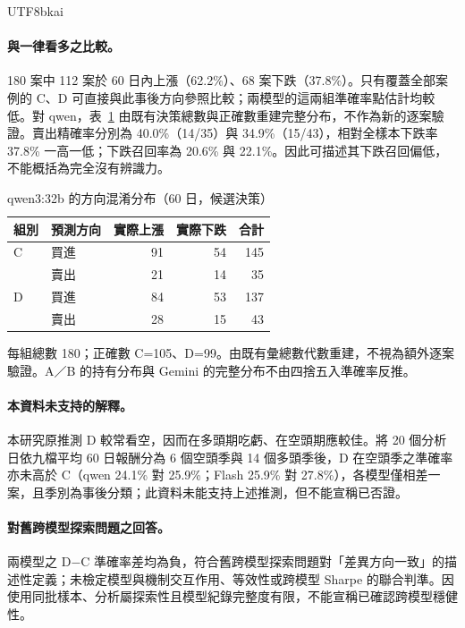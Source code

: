 \documentclass[12pt,a4paper]{article}
\newcommand{\grp}[1]{\textsf{#1}}
\begin{document}
\begin{CJK}{UTF8}{bkai}
\paragraph{與一律看多之比較。} 180 案中 112 案於 60 日內上漲（62.2\%）、68 案下跌（37.8\%）。只有覆蓋全部案例的 \grp{C}、\grp{D} 可直接與此事後方向參照比較；兩模型的這兩組準確率點估計均較低。對 qwen，表~\ref{tab:confusion} 由既有決策總數與正確數重建完整分布，不作為新的逐案驗證。賣出精確率分別為 40.0\%（14/35）與 34.9\%（15/43），相對全樣本下跌率 37.8\% 一高一低；下跌召回率為 20.6\% 與 22.1\%。因此可描述其下跌召回偏低，不能概括為完全沒有辨識力。

\begin{table}[H]
\centering\small
\caption{qwen3:32b 的方向混淆分布（60 日，候選決策）}
\label{tab:confusion}
\begin{tabular}{@{}llrrr@{}}
\toprule
組別 & 預測方向 & 實際上漲 & 實際下跌 & 合計 \\
\midrule
\grp{C} & 買進 & 91 & 54 & 145 \\
         & 賣出 & 21 & 14 & 35 \\
\grp{D} & 買進 & 84 & 53 & 137 \\
         & 賣出 & 28 & 15 & 43 \\
\bottomrule
\end{tabular}
\par\smallskip
\raggedright\footnotesize 每組總數 180；正確數 C=105、D=99。由既有彙總數代數重建，不視為額外逐案驗證。A／B 的持有分布與 Gemini 的完整分布不由四捨五入準確率反推。
\end{table}

\paragraph{本資料未支持的解釋。} 本研究原推測 \grp{D} 較常看空，因而在多頭期吃虧、在空頭期應較佳。將 20 個分析日依九檔平均 60 日報酬分為 6 個空頭季與 14 個多頭季後，\grp{D} 在空頭季之準確率亦未高於 \grp{C}（qwen 24.1\% 對 25.9\%；Flash 25.9\% 對 27.8\%），各模型僅相差一案，且季別為事後分類；此資料未能支持上述推測，但不能宣稱已否證。

\paragraph{對舊跨模型探索問題之回答。} 兩模型之 \grp{D}$-$\grp{C} 準確率差均為負，符合舊跨模型探索問題對「差異方向一致」的描述性定義；未檢定模型與機制交互作用、等效性或跨模型 Sharpe 的聯合判準。因使用同批樣本、分析屬探索性且模型紀錄完整度有限，不能宣稱已確認跨模型穩健性。


\end{CJK}
\end{document}
